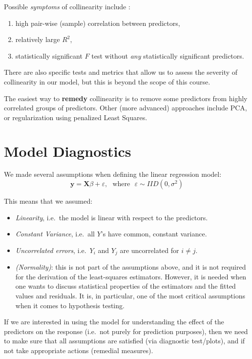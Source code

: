 \documentclass[
]{book}
\begin{document}
Possible \emph{symptoms} of collinearity include :

\begin{enumerate}
\def\labelenumi{(\roman{enumi})}
\item
  high pair-wise (sample) correlation between predictors,
\item
  relatively large \(R^2\),
\item
  statistically significant \(F\) test without \emph{any} statistically significant predictors.
\end{enumerate}

There are also specific tests and metrics that allow us to assess the severity of collinearity in our model, but this is beyond the scope of this course.

The easiest way to \textbf{remedy} collinearity is to remove some predictors from highly correlated groups of predictors. Other (more advanced) approaches include PCA, or regularization using penalized Least Squares.

\section{Model Diagnostics}\label{model-diagnostics}

We made several assumptions when defining the linear regression model:
\[\mathbf{y} =  \mathbf{X}\beta + \varepsilon,\,\, \text{ where } \,\, \varepsilon \sim IID(0, \sigma^2)\]

This means that we assumed:

\begin{itemize}
\item
  \emph{Linearity}, i.e.~the model is linear with respect to the predictors.
\item
  \emph{Constant Variance}, i.e.~all \(Y\)'s have common, constant variance.
\item
  \emph{Uncorrelated errors}, i.e.~\(Y_i\) and \(Y_j\) are uncorrelated for \(i\neq j\).
\item
  \emph{(Normality)}: this is not part of the assumptions above, and it is not required for the derivation of the least-squares estimators. However, it is needed when one wants to discuss statistical properties of the estimators and the fitted values and residuals. It is, in particular, one of the most critical assumptions when it comes to hypothesis testing.
\end{itemize}

If we are interested in using the model for understanding the effect of the predictors on the response (i.e.~not purely for prediction purposes), then we need to make sure that all assumptions are satisfied (via diagnostic test/plots), and if not take appropriate actions (remedial measures).
\end{document}
